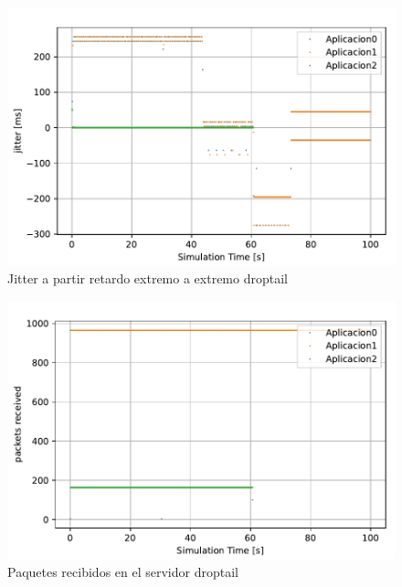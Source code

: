 \begin{figure}
    \centering
    \includegraphics{graficas/DropTail/jitter_DT.pdf}
    \caption{Jitter a partir retardo extremo a extremo droptail}
    \label{fig:sinqos_pktreceived99100}
\end{figure}

\begin{figure}
    \centering
    \includegraphics{graficas/DropTail/packetsReceived_DT.pdf}
    \caption{Paquetes recibidos en el servidor droptail}
    \label{fig:sinqos_pktreceived99100}
\end{figure}

